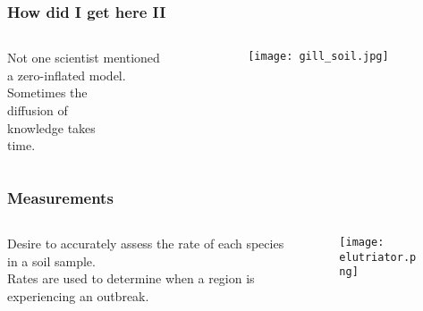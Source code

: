 \documentclass{beamer} %
\theoremstyle{definition} %
\begin{document}
\begin{frame} 
\frametitle{How did I get here II}
\begin{columns} %
\begin{column}{0.4\textwidth} %
Not one scientist mentioned\\
a zero-inflated model. \\
\vspace{0.5in}
\pause
Sometimes the \\
diffusion of \\
knowledge takes \\
time. 
\end{column}
\begin{column}{0.5\textwidth} %
\begin{figure}[htb]
\hspace{-0.4in}\texttt{[image: gill\_soil.jpg]}
\end{figure}
\end{column}
\end{columns}
\end{frame}


\begin{frame}
\frametitle{Measurements}
\begin{columns} %
\begin{column}{0.5\textwidth} %
Desire to accurately assess the rate of each species in a soil sample. \\
\vspace{1in}
\pause
Rates are used to determine when a region is experiencing an outbreak. \\
\pause
\end{column}
\begin{column}{0.5\textwidth} %
\begin{figure}[htb]
\hspace{-0.4in}\texttt{[image: elutriator.png]}
\end{figure}
\end{column}
\end{columns}
\end{frame}
\end{document}
